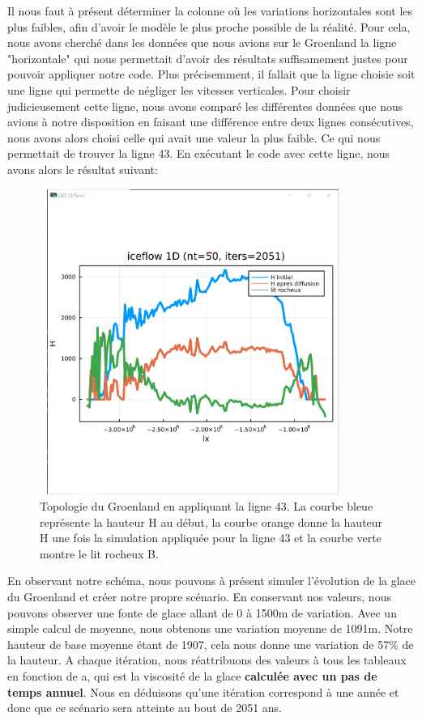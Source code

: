 \documentclass{article}
\begin{document}
\newpage
Il nous faut à présent déterminer la colonne où les variations horizontales sont les plus faibles, afin d'avoir le modèle le plus proche possible de la réalité.
\newline
Pour cela, nous avons cherché dans les données que nous avions sur le Groenland la ligne "horizontale" qui nous permettait d'avoir des résultats suffisamement justes pour pouvoir appliquer notre code. Plus précisemment, il fallait que la ligne choisie soit une ligne qui permette de négliger les vitesses verticales.
Pour choisir judicieusement cette ligne, nous avons comparé les différentes données que nous avions à notre disposition en faisant une différence entre deux lignes consécutives, nous avons alors choisi celle qui avait une valeur la plus faible. Ce qui nous permettait de trouver la ligne 43. 
\newline
En exécutant le code avec cette ligne, nous avons alors le résultat suivant: 
\begin{figure}[!htpb]
\centering
\includegraphics[width=10cm, keepaspectratio=true, height=10cm]{ligne43.png}
\caption{Topologie du Groenland en appliquant la ligne 43. La courbe bleue  représente la hauteur H au début, la courbe orange donne la hauteur H une fois la simulation appliquée pour la ligne 43 et la courbe verte montre le lit rocheux B. }
\end{figure}
\newpage
En observant notre schéma, nous pouvons à présent simuler l'évolution de la glace du Groenland et créer notre propre scénario. En conservant nos valeurs, nous pouvons observer une fonte de glace allant de 0 à 1500m de variation. Avec un simple calcul de moyenne, nous obtenons une variation moyenne de 1091m. Notre hauteur de base moyenne étant de 1907, cela nous donne une variation de 57\% de la hauteur. A chaque itération, nous réattribuons des valeurs à tous les tableaux en fonction de a, qui est la viscosité de la glace \textbf{calculée avec un pas de temps annuel}. Nous en déduisons qu'une itération correspond à une année et donc que ce scénario sera atteinte au bout de 2051 ans. 
\end{document}

